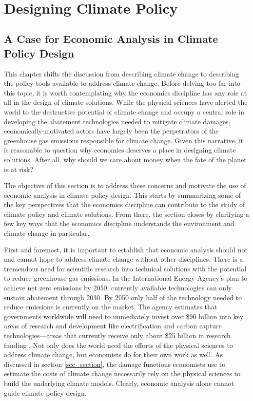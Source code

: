 ~

\newpage
\section{Designing Climate Policy}

\subsection{A Case for Economic Analysis in Climate Policy Design}

This chapter shifts the discussion from describing climate change to describing the policy tools available to address climate change. Before delving too far into this topic, it is worth contemplating why the economics discipline has any role at all in the design of climate solutions. While the physical sciences have alerted the world to the destructive potential of climate change and occupy a central role in developing the abatement technologies needed to mitigate climate damages, economically-motivated actors have largely been the perpetrators of the greenhouse gas emissions responsible for climate change. Given this narrative, it is reasonable to question why economics deserves a place in designing climate solutions.  After all, why should we care about money when the fate of the planet is at risk?

The objective of this section is to address these concerns and motivate the use of economic analysis in climate policy design.  This starts by summarizing some of the key perspectives that the economics discipline can contribute to the study of climate policy and climate solutions. From there, the section closes by clarifying a few key ways that the economics discipline understands the environment and climate change in particular. 

First and foremost, it is important to establish that economic analysis should not and cannot hope to address climate change without other disciplines. There is a tremendous need for scientific research into technical solutions with the potential to reduce greenhouse gas emissions. In the International Energy Agency's plan to achieve net zero emissions by 2050, currently available technologies can only sustain abatement through 2030. By 2050 only half of the technology needed to reduce emissions is currently on the market. The agency estimates that governments worldwide will need to immediately invest over \$90 billion into key areas of research and development like electrification and carbon capture technologies---areas that currently receive only about \$25 billion in research funding \citep{ieareport}. Not only does the world need the efforts of the physical sciences to address climate change, but economists do for their own work as well. As discussed in section \ref{scc_section}, the damage functions economists use to estimate the costs of climate change necessarily rely on the physical sciences to build the underlying climate models. Clearly, economic analysis alone cannot guide climate policy design. 

